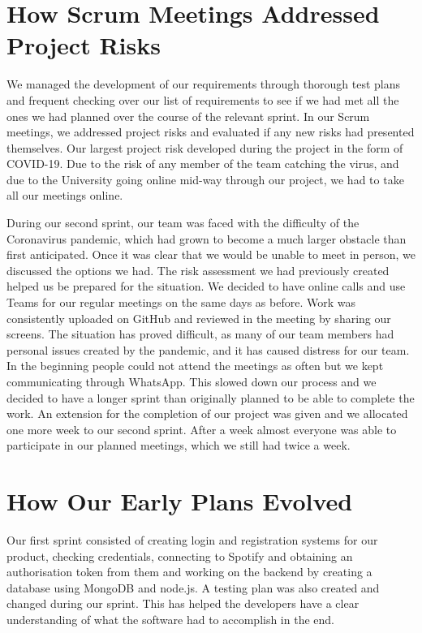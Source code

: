 \documentclass[10pt]{report}
\begin{document}
\section{How Scrum Meetings Addressed Project Risks}

We managed the development of our requirements through thorough test plans and frequent checking over our list of requirements to see if we had met all the ones we had planned over the course of the relevant sprint.  In our Scrum meetings, we addressed project risks and evaluated if any new risks had presented themselves. Our largest project risk developed during the project in the form of COVID-19. Due to the risk of any member of the team catching the virus, and due to the University going online mid-way through our project, we had to take all our meetings online. 

During our second sprint, our team was faced with the difficulty of the Coronavirus pandemic, which had grown to become a much larger obstacle than first anticipated. Once it was clear that we would be unable to meet in person, we discussed the options we had. The risk assessment we had previously created helped us be prepared for the situation. We decided to have online calls and use Teams for our regular meetings on the same days as before. Work was consistently uploaded on GitHub and reviewed in the meeting by sharing our screens. The situation has proved difficult, as many of our team members had personal issues created by the pandemic, and it has caused distress for our team. In the beginning people could not attend the meetings as often but we kept communicating through WhatsApp. This slowed down our process and we decided to have a longer sprint than originally planned to be able to complete the work. An extension for the completion of our project was given and we allocated one more week to our second sprint. After a week almost everyone was able to participate in our planned meetings, which we still had twice a week.

\section{How Our Early Plans Evolved}

Our first sprint consisted of creating login and registration systems for our product, checking credentials, connecting to Spotify and obtaining an authorisation token from them and working on the backend by creating a database using MongoDB and node.js. A testing plan was also created and changed during our sprint. This has helped the developers have a clear understanding of what the software had to accomplish in the end.
\end{document}
